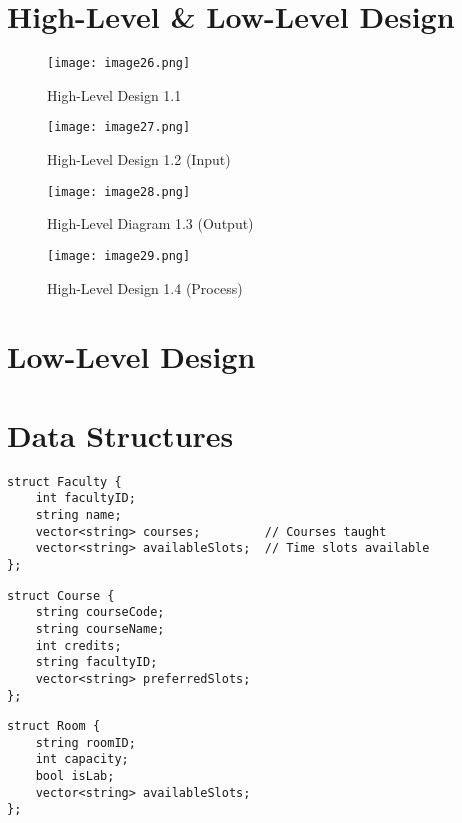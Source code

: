 \documentclass[12pt]{article}
\begin{document}
\section{High-Level \& Low-Level Design}
\begin{figure}[H]
    \centering
    \texttt{[image: image26.png]}
    \caption{High-Level Design 1.1 }
    \label{fig:placeholder}
\end{figure}
\begin{figure}[H]
    \centering
    \texttt{[image: image27.png]}
    \caption{High-Level Design 1.2 (Input)}
    \label{fig:placeholder}
\end{figure}
\begin{figure}[H]
    \centering
    \texttt{[image: image28.png]}
    \caption{High-Level Diagram 1.3 (Output)}
    \label{fig:placeholder}
\end{figure}
\begin{figure}[H]
    \centering
    \texttt{[image: image29.png]}
    \caption{High-Level Design 1.4 (Process)}
    \label{fig:placeholder}
\end{figure}
\section*{Low-Level Design}
\section*{Data Structures}

\begin{lstlisting}[style=cppstyle, caption=Faculty Information]
struct Faculty {
    int facultyID;
    string name;
    vector<string> courses;         // Courses taught
    vector<string> availableSlots;  // Time slots available
};
\end{lstlisting}

\begin{lstlisting}[style=cppstyle, caption=Course Information]
struct Course {
    string courseCode;
    string courseName;
    int credits;
    string facultyID;
    vector<string> preferredSlots;
};
\end{lstlisting}

\begin{lstlisting}[style=cppstyle, caption=Classroom/Lab Information]
struct Room {
    string roomID;
    int capacity;
    bool isLab;
    vector<string> availableSlots;
};
\end{lstlisting}
\end{document}
